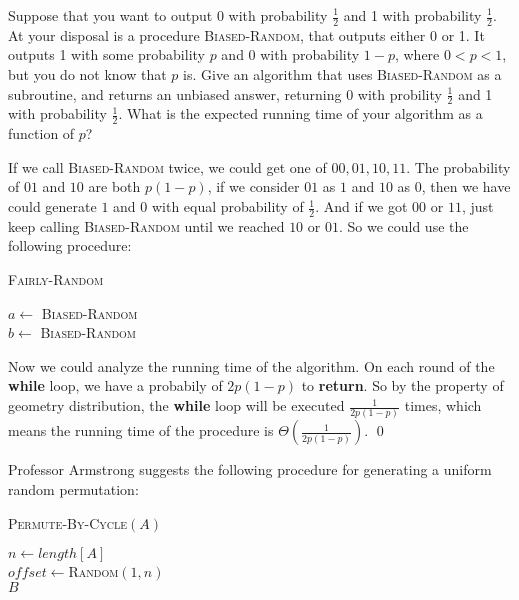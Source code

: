 
Suppose that you want to output 0 with probability $\frac{1}{2}$ and 1 with probability $\frac{1}{2}$. At your disposal is a procedure \textsc{Biased-Random}, that outputs
either 0 or 1. It outputs 1 with some probability $p$ and 0 with probability $1-p$, where $0 < p < 1$, but you do not know that $p$ is. Give an algorithm that uses
\textsc{Biased-Random} as a subroutine, and returns an unbiased answer, returning 0 with probility $\frac{1}{2}$ and 1 with probability $\frac{1}{2}$. What is the expected
running time of your algorithm as a function of $p$?

\answer

If we call \textsc{Biased-Random} twice, we could get one of $00, 01, 10, 11$. The probability of $01$ and $10$ are both $p(1-p)$, if we consider $01$ as $1$ and $10$ as $0$,
then we have could generate $1$ and $0$ with equal probability of $\frac{1}{2}$. And if we got $00$ or $11$, just keep calling \textsc{Biased-Random} until we reached 
$10$ or $01$. So we could use the following procedure:

\begin{algorithm}[H]
\caption{\textsc{Fairly-Random}}
 {
  $a \leftarrow$ \textsc{Biased-Random}\\
  $b \leftarrow$ \textsc{Biased-Random}\\
   {
  }
}
\end{algorithm}

Now we could analyze the running time of the algorithm. On each round of the \textbf{while} loop, we have a probabily of $2p(1-p)$ to \textbf{return}. So by the property of
geometry distribution, the \textbf{while} loop will be executed $\frac{1}{2p(1-p)}$ times, which means the running time of the procedure is $\Theta\left(\frac{1}{2p(1-p)}\right)$.
\qed


Professor Armstrong suggests the following procedure for generating a uniform random permutation:

\begin{algorithm}[H]
\caption{\textsc{Permute-By-Cycle}$(A)$}
$n \leftarrow length[A]$\\
$offset \leftarrow$\textsc{Random}$(1, n)$\\
\Return $B$
\end{algorithm}

